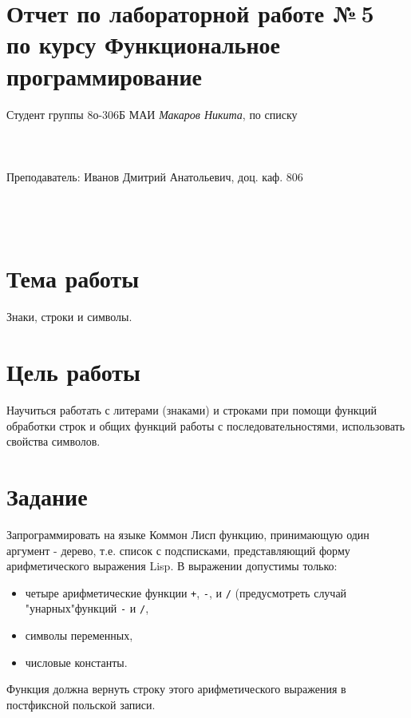 \documentclass[a4paper, 12pt]{article}
\begin{document}
\section*{Отчет по лабораторной работе №\,5
\\по курсу \guillemotleft  Функциональное программирование\guillemotright}

\begin{flushright}
Студент группы 8о-306Б МАИ \textit{Макаров Никита},  по списку \\
 \\
 \\
\ \\
Преподаватель: Иванов Дмитрий Анатольевич, доц. каф. 806 \\
 \\
 \\
 \\

\end{flushright}


\section{Тема работы}
Знаки, строки и символы.

\section{Цель работы}
Научиться работать с литерами (знаками) и строками при помощи функций обработки строк и общих функций работы с последовательностями, использовать свойства символов.

\section{Задание}
Запрограммировать на языке Коммон Лисп функцию, принимающую один аргумент - дерево, т.е. список с подсписками, представляющий форму арифметического выражения Lisp. В выражении допустимы только:
\begin{itemize}
\item четыре арифметические функции {\tt +}, {\tt -}, {\tt *} и {\tt /} (предусмотреть случай "унарных"\;функций {\tt -} и {\tt /},
\item символы переменных,
\item числовые константы.
\end{itemize}
Функция должна вернуть строку этого арифметического выражения в постфиксной польской записи.
\end{document}
